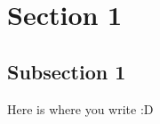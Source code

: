 \documentclass[12pt,a4paper, spanish]{article}
\begin{document}
\newpage
\thispagestyle{empty}
\renewcommand*\contentsname{Index of contents}
\tableofcontents

\newpage
{}

\section{Section 1}
\subsection{Subsection 1}

Here is where you write :D
\end{document}
